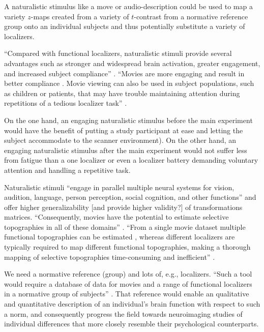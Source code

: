 %
A naturalistic stimulus like a move or audio-description could be used to map a
variety $z$-maps created from a variety of $t$-contrast from a normative
reference group onto an individual subjects and thus potentially substitute a
variety of localizers.


%
``Compared with functional localizers, naturalistic stimuli provide several
advantages such as stronger and widespread brain activation, greater engagement,
and increased subject compliance'' \citep{jiahui2020predicting}.
%
``Movies are more engaging and result in better compliance
\citep{vanderwal2015inscapes}.
%
Movie viewing can also be used in subject populations, such as children
\citep{richardson2018development} or patients, that may have trouble maintaining
attention during repetitions of a tedious localizer task''
\citep{jiahui2020predicting}.

%
On the one hand, an engaging naturalistic stimulus before the main experiment
would have the benefit of putting a study participant at ease and letting the
subject accommodate to the scanner environment).
%
On the other hand, an engaging naturalistic stimulus after the main experiment
would not suffer less from fatigue than a one localizer or even a localizer
battery demanding voluntary attention and handling a repetitive task.


%
Naturalistic stimuli ``engage in parallel multiple neural systems for vision,
audition, language, person perception, social cognition, and other functions''
\citep{jiahui2020predicting} and offer higher generalizability [and provide
higher validity?] of transformations matrices.
%
``Consequently, movies have the potential to estimate selective topographies in
all of these domains'' \citep{jiahui2020predicting}.
``From a single movie dataset multiple functional topographies can be estimated
\citep{guntupalli2016model}, whereas different localizers are typically required
to map different functional topographies, making a thorough mapping of selective
topographies time-consuming and inefficient'' \citep{jiahui2020predicting}.


%
We need a normative reference (group) and lots of, e.g., localizers.
%
``Such a tool would require a database of data for movies and a range of
functional localizers in a normative group of subjects''
\citep{jiahui2020predicting}.
%
That reference would enable an qualitative and quantitative description of an
individual's brain function with respect to such a norm, and consequently
progress the field towards neuroimaging studies of individual differences that
more closely resemble their psychological counterparts.



